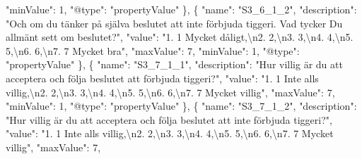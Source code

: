 \documentclass[
]{book}
\newenvironment{Shaded}{\begin{snugshade}}{\end{snugshade}}
\newcommand{\CharTok}[1]{\textcolor[rgb]{0.31,0.60,0.02}{#1}}
\newcommand{\DataTypeTok}[1]{\textcolor[rgb]{0.13,0.29,0.53}{#1}}
\newcommand{\DecValTok}[1]{\textcolor[rgb]{0.00,0.00,0.81}{#1}}
\newcommand{\FunctionTok}[1]{\textcolor[rgb]{0.00,0.00,0.00}{#1}}
\newcommand{\OtherTok}[1]{\textcolor[rgb]{0.56,0.35,0.01}{#1}}
\newcommand{\StringTok}[1]{\textcolor[rgb]{0.31,0.60,0.02}{#1}}
\begin{document}
\begin{Shaded}
\begin{Highlighting}[]
      \DataTypeTok{"minValue"}\FunctionTok{:} \DecValTok{1}\FunctionTok{,}
      \DataTypeTok{"@type"}\FunctionTok{:} \StringTok{"propertyValue"}
    \FunctionTok{\}}\OtherTok{,}
    \FunctionTok{\{}
      \DataTypeTok{"name"}\FunctionTok{:} \StringTok{"S3_6_1_2"}\FunctionTok{,}
      \DataTypeTok{"description"}\FunctionTok{:} \StringTok{"Och om du tänker på själva beslutet att inte förbjuda tiggeri. Vad tycker Du allmänt sett om beslutet?"}\FunctionTok{,}
      \DataTypeTok{"value"}\FunctionTok{:} \StringTok{"1. 1 Mycket dåligt,}\CharTok{\textbackslash{}n}\StringTok{2. 2,}\CharTok{\textbackslash{}n}\StringTok{3. 3,}\CharTok{\textbackslash{}n}\StringTok{4. 4,}\CharTok{\textbackslash{}n}\StringTok{5. 5,}\CharTok{\textbackslash{}n}\StringTok{6. 6,}\CharTok{\textbackslash{}n}\StringTok{7. 7 Mycket bra"}\FunctionTok{,}
      \DataTypeTok{"maxValue"}\FunctionTok{:} \DecValTok{7}\FunctionTok{,}
      \DataTypeTok{"minValue"}\FunctionTok{:} \DecValTok{1}\FunctionTok{,}
      \DataTypeTok{"@type"}\FunctionTok{:} \StringTok{"propertyValue"}
    \FunctionTok{\}}\OtherTok{,}
    \FunctionTok{\{}
      \DataTypeTok{"name"}\FunctionTok{:} \StringTok{"S3_7_1_1"}\FunctionTok{,}
      \DataTypeTok{"description"}\FunctionTok{:} \StringTok{"Hur villig är du att acceptera och följa beslutet att förbjuda tiggeri?"}\FunctionTok{,}
      \DataTypeTok{"value"}\FunctionTok{:} \StringTok{"1. 1 Inte alls villig,}\CharTok{\textbackslash{}n}\StringTok{2. 2,}\CharTok{\textbackslash{}n}\StringTok{3. 3,}\CharTok{\textbackslash{}n}\StringTok{4. 4,}\CharTok{\textbackslash{}n}\StringTok{5. 5,}\CharTok{\textbackslash{}n}\StringTok{6. 6,}\CharTok{\textbackslash{}n}\StringTok{7. 7 Mycket villig"}\FunctionTok{,}
      \DataTypeTok{"maxValue"}\FunctionTok{:} \DecValTok{7}\FunctionTok{,}
      \DataTypeTok{"minValue"}\FunctionTok{:} \DecValTok{1}\FunctionTok{,}
      \DataTypeTok{"@type"}\FunctionTok{:} \StringTok{"propertyValue"}
    \FunctionTok{\}}\OtherTok{,}
    \FunctionTok{\{}
      \DataTypeTok{"name"}\FunctionTok{:} \StringTok{"S3_7_1_2"}\FunctionTok{,}
      \DataTypeTok{"description"}\FunctionTok{:} \StringTok{"Hur villig är du att acceptera och följa beslutet att inte förbjuda tiggeri?"}\FunctionTok{,}
      \DataTypeTok{"value"}\FunctionTok{:} \StringTok{"1. 1 Inte alls villig,}\CharTok{\textbackslash{}n}\StringTok{2. 2,}\CharTok{\textbackslash{}n}\StringTok{3. 3,}\CharTok{\textbackslash{}n}\StringTok{4. 4,}\CharTok{\textbackslash{}n}\StringTok{5. 5,}\CharTok{\textbackslash{}n}\StringTok{6. 6,}\CharTok{\textbackslash{}n}\StringTok{7. 7 Mycket villig"}\FunctionTok{,}
      \DataTypeTok{"maxValue"}\FunctionTok{:} \DecValTok{7}\FunctionTok{,}

\end{Highlighting}
\end{Shaded}
\end{document}
